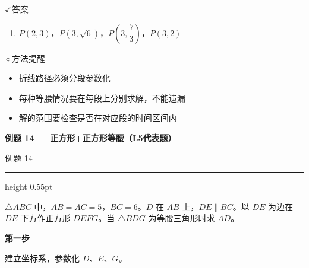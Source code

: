 \documentclass{exam-zh}
\newcommand{\eduSectionTitle}[1]{%
  \needspace{5\baselineskip}%
  \vspace{2mm}
  {\color{edu-blue}\bfseries\large #1}\par
  \vspace{3mm}
}
\newenvironment{eduSubQuestionItem}[1]{%
  \needspace{4\baselineskip}%
  \vspace{2mm}
  \par\noindent
  \hangindent=8mm\hangafter=1
  {\color{edu-blue}\bfseries #1}\enspace
  \begingroup
  \color{edu-ink}
}{%
  \endgroup
  \par
  \vspace{3mm}
}
\newcommand{\eduIconCheck}{\(\checkmark\)}
\newcommand{\eduIconPin}{\(\diamond\)}
\newenvironment{eduProblemBlock}[1][题目]{%
  \needspace{8\baselineskip}
  {\small\color{edu-muted}#1}\par
  \vspace{1.5mm}
  {\color{edu-blue}\hrule height 0.55pt}
  \vspace{4.5mm}
  \begingroup
  \color{edu-ink}
  \large
  \setlength{\parskip}{2.2mm}
  \linespread{1.20}\selectfont
}{%
  \par
  \endgroup
  \vspace{6mm}
}
\newenvironment{eduBulletList}{%
  \begin{itemize}[
    label=\textbullet,
    leftmargin=5mm,
    itemsep=1.2mm,
    topsep=0pt,
    parsep=0pt
  ]
}{%
  \end{itemize}
}
\newenvironment{eduBottomGrid}{%
  \vspace{1mm}
  \par\noindent
}{%
  \par\vspace{1mm}
}
\newenvironment{eduSummaryLeft}{%
  \begin{minipage}[t]{0.30\linewidth}
}{%
  \end{minipage}
}
\newcommand{\eduSummaryDivider}{%
  \hspace{4mm}{\color{edu-line}\vrule width 0.35pt}\hspace{7mm}%
}
\newenvironment{eduSummaryRight}{%
  \begin{minipage}[t]{0.58\linewidth}
}{%
  \end{minipage}
}
\newenvironment{eduPlainList}{%
  \begin{enumerate}[
    label=(\arabic*),
    leftmargin=7mm,
    itemsep=1.2mm,
    topsep=0pt,
    parsep=0pt
  ]
}{%
  \end{enumerate}
}
\begin{document}
\begin{eduBottomGrid}
  \begin{eduSummaryLeft}
    \begin{eduSummaryBlock}{\eduIconCheck}{答案}
    \begin{eduPlainList}
      \item $P(2,3)$，$P(3,\sqrt{6})$，$P\left(3,\dfrac{7}{3}\right)$，$P(3,2)$    \end{eduPlainList}
    \end{eduSummaryBlock}
  \end{eduSummaryLeft}
  \eduSummaryDivider
  \begin{eduSummaryRight}
    \begin{eduSummaryBlock}{\eduIconPin}{方法提醒}
    \begin{eduBulletList}
      \item 折线路径必须分段参数化      \item 每种等腰情况要在每段上分别求解，不能遗漏      \item 解的范围要检查是否在对应段的时间区间内    \end{eduBulletList}
    \end{eduSummaryBlock}
  \end{eduSummaryRight}
\end{eduBottomGrid}



\eduSectionTitle{例题 14 — 正方形+正方形等腰（L5代表题）}

\begin{eduProblemBlock}[例题 14]
$\triangle ABC$ 中，$AB=AC=5$，$BC=6$。$D$ 在 $AB$ 上，$DE \parallel BC$。以 $DE$ 为边在 $DE$ 下方作正方形 $DEFG$。当 $\triangle BDG$ 为等腰三角形时求 $AD$。
\end{eduProblemBlock}





\begin{eduSubQuestionItem}{第一步}
建立坐标系，参数化 $D$、$E$、$G$。\end{eduSubQuestionItem}
\end{document}
